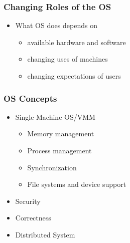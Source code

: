 \begin{frame}[plain]	
	\frametitle{Changing Roles of the OS}
	
	\begin{itemize}\Large
		\item What OS does depends on
		\begin{itemize}\large
			\item available hardware and software
			\item changing uses of machines
			\item changing expectations of users
			
		\end{itemize}
	\end{itemize}
	
	
\end{frame}

\begin{frame}[plain]	
	\frametitle{OS Concepts}
	
	\begin{itemize}\Large
		\item Single-Machine OS/VMM
		\begin{itemize}\large
			\item Memory management
			\item Process management
			\item Synchronization
			\item File systems and device support
			
		\end{itemize}
		\item Security
		\item Correctness
		\item Distributed System
	\end{itemize}
	
	
\end{frame}


